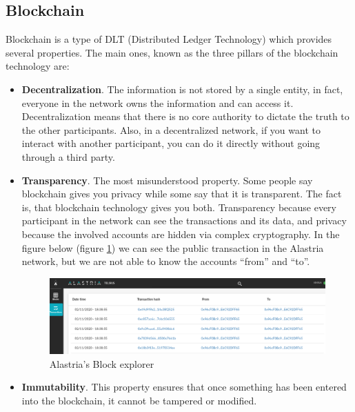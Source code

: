 \documentclass[a4paper, 12pt]{article} %
\begin{document}
    \subsection{Blockchain}
        Blockchain\cite{Bitcoin2015}\cite{blockchain-hype}\cite{blockchain-tech} is a type of DLT (Distributed Ledger Technology) which provides several properties. The main ones, known as the three pillars of the blockchain technology are:
        \begin{itemize}
            \item \textbf{Decentralization}. The information is not stored by a single entity, in fact, everyone in the network owns the information and can access it. Decentralization means that there is no core authority to dictate the truth to the other participants. Also, in a decentralized network, if you want to interact with another participant, you can do it directly without going through a third party.
            \item \textbf{Transparency}. The most misunderstood property. Some people say blockchain gives you privacy while some say that it is transparent. The fact is, that blockchain technology gives you both. Transparency because every participant in the network can see the transactions and its data, and privacy because the involved accounts are hidden via complex cryptography. In the figure below (figure \ref{fig:alastria_block_explorer}) we can see the public transaction in the Alastria network, but we are not able to know the accounts “from” and “to”.
            \begin{figure}[h]
                \centering
                \includegraphics[width=1.1\textwidth]{Alastria-block-exporer.png}
                \caption{Alastria's Block explorer}
                \label{fig:alastria_block_explorer}
            \end{figure}
            \item \textbf{Immutability}. This property ensures that once something has been entered into the blockchain, it cannot be tampered or modified.
        \end{itemize}
        
\end{document}
